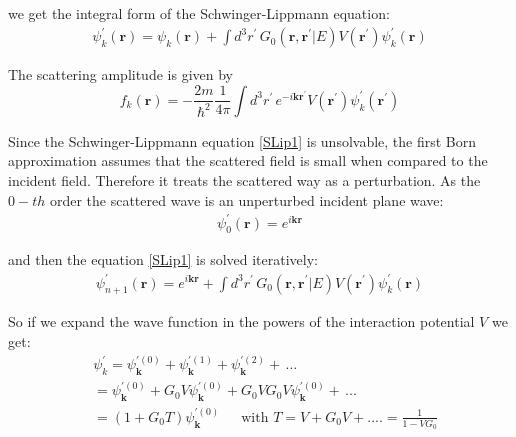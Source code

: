 we get the integral form of the Schwinger-Lippmann equation:
\begin{equation}\label{SLip1}
\begin{split}
\psi^{'}_k(\mathbf{r}) = \psi_k(\mathbf{r}) + \int{d^3r^{'}\,G_0(\mathbf{r}, \mathbf{r}^{'}| E)V(\mathbf{r}^{'})\psi^{'}_k(\mathbf{r})}
\end{split}
\end{equation}

The scattering amplitude is given by \cite{DWBA}
\begin{equation}\label{fsc1}
f_k(\mathbf{r}) = -\frac{2m}{\hbar^2}\frac{1}{4\pi}\int{d^3r^{'}\,e^{-i\mathbf{k}\mathbf{r}^{'}}V(\mathbf{r}^{'})\psi^{'}_k(\mathbf{r}^{'})}
\end{equation}

Since the Schwinger-Lippmann equation \eqref{SLip1} is unsolvable, the first Born approximation assumes that the scattered field is small when compared to the incident field. Therefore it treats the scattered way as a perturbation. As the $ 0 - th $ order the scattered wave is an unperturbed incident plane wave: 
\begin{equation}
\begin{split}
\psi^{'}_0(\mathbf{r}) = e^{i\mathbf{k}\mathbf{r}}
\end{split}
\end{equation}

and then the equation \eqref{SLip1} is solved iteratively:
\begin{equation}\label{SLi1}
\begin{split}
\psi^{'}_{n+1}(\mathbf{r}) = e^{i\mathbf{k}\mathbf{r}} + \int{d^3r^{'}\,G_0(\mathbf{r}, \mathbf{r}^{'}| E)V(\mathbf{r}^{'})\psi^{'}_k(\mathbf{r}) }
\end{split}
\end{equation}

So if we expand the wave function in the powers of the interaction potential $ V $ we get:
\begin{equation}\label{SLP1}
\begin{split}
& \psi^{'}_k = \psi^{'(0)}_{\mathbf{k}} + \psi^{'(1)}_{\mathbf{k}} +  \psi^{'(2)}_{\mathbf{k}} +\, ...\, \\[.8em]
& = \psi^{'(0)}_{\mathbf{k}} + G_0V\psi^{'(0)}_{\mathbf{k}} + G_0VG_0V\psi^{'(0)}_{\mathbf{k}} + \,...\, \\[.8em]
& = (1 + G_0T)\psi^{'(0)}_{\mathbf{k}}\,\,\,\,\,\,\,\text{ with } T = V + G_0V + .... = \frac{1}{1-VG_0}
\end{split}
\end{equation}


